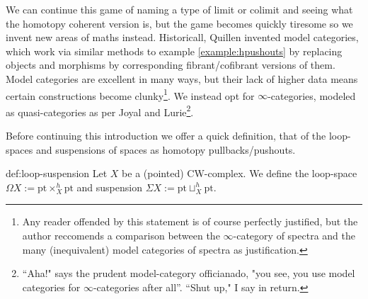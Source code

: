 We can continue this game of naming a type of limit or colimit and seeing what the homotopy coherent version is, but the game becomes quickly tiresome so we invent new areas of maths instead. Historicall, Quillen invented model categories, which work via similar methods to example \ref{example:hpushouts} by replacing objects and morphisms by corresponding fibrant/cofibrant versions of them. Model categories are excellent in many ways, but their lack of higher data means certain constructions become clunky\footnote{Any reader offended by this statement is of course perfectly justified, but the author reccomends a comparison between the $\infty$-category of spectra and the many (inequivalent) model categories of spectra as justification.}. We instead opt for $\infty$-categories, modeled as quasi-categories as per Joyal and Lurie\footnote{``Aha!" says the prudent model-category officianado, "you see, you use model categories for $\infty$-categories after all''. ``Shut up," I say in return.}.

Before continuing this introduction we offer a quick definition, that of the loop-spaces and suspensions of spaces as homotopy pullbacks/pushouts.

\begin{definition}{def:loop-suspension}
Let $X$ be a (pointed) CW-complex. We define the loop-space $\Omega X := \text{pt} \times_X^h \text{pt}$ and suspension $\Sigma X := \text{pt} \sqcup_X^h \text{pt}$. 
\end{definition}

